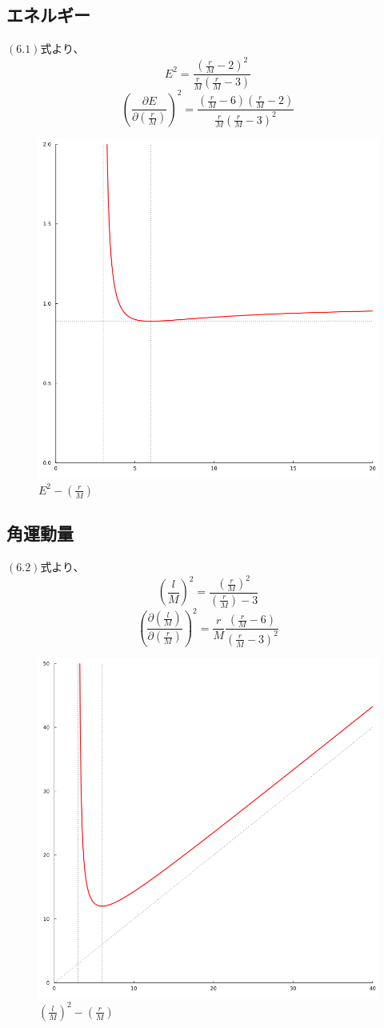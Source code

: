 \documentclass[dvipdfmx]{report} %
\begin{document}
\subsection{
	エネルギー
}
$(6.1)$式より、
\[
E^2 = \frac{\left( \frac{r}{M} - 2 \right)^2}{ \frac{r}{M} \left( \frac{r}{M} - 3 \right) }
\]
\[
\left( \frac{\partial E }{\partial \left( \frac{r}{M} \right)} \right)^2 = \frac{ \left( \frac{r}{M} - 6 \right) \left( \frac{r}{M} - 2 \right) }{ \frac{r}{M} \left( \frac{r}{M} - 3 \right)^2 }
\]
\begin{figure}[H]
    \centering
    \includegraphics[width=0.5\columnwidth]{./images/schwarzschild/09.png}
    \caption{$E^2 - \left( \frac{r}{M} \right)$}
    \label{}
\end{figure}
\subsection{
	角運動量
}
$(6.2)$式より、
\[
\left( \frac{l}{M} \right)^2 = \frac{\left( \frac{r}{M} \right)^2}{ \left( \frac{r}{M} \right) - 3 }
\]
\[
\left( \frac{\partial \left( \frac{l}{M} \right) }{\partial \left( \frac{r}{M} \right)} \right)^2 = \frac{r}{M} \frac{ \left( \frac{r}{M} - 6 \right)}{ \left( \frac{r}{M} - 3 \right)^2 }
\]
\begin{figure}[H]
    \centering
    \includegraphics[width=0.5\columnwidth]{./images/schwarzschild/08.png}
    \caption{$\left( \frac{l}{M} \right)^2 - \left( \frac{r}{M} \right)$}
    \label{}
\end{figure}
\end{document}
